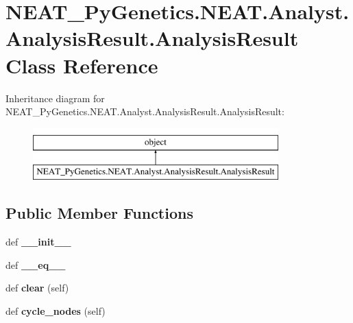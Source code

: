 \hypertarget{class_n_e_a_t___py_genetics_1_1_n_e_a_t_1_1_analyst_1_1_analysis_result_1_1_analysis_result}{}\section{N\+E\+A\+T\+\_\+\+Py\+Genetics.\+N\+E\+A\+T.\+Analyst.\+Analysis\+Result.\+Analysis\+Result Class Reference}
\label{class_n_e_a_t___py_genetics_1_1_n_e_a_t_1_1_analyst_1_1_analysis_result_1_1_analysis_result}
Inheritance diagram for N\+E\+A\+T\+\_\+\+Py\+Genetics.\+N\+E\+A\+T.\+Analyst.\+Analysis\+Result.\+Analysis\+Result\+:\begin{figure}[H]
\begin{center}
\leavevmode
\includegraphics[height=2.000000cm]{class_n_e_a_t___py_genetics_1_1_n_e_a_t_1_1_analyst_1_1_analysis_result_1_1_analysis_result}
\end{center}
\end{figure}
\subsection*{Public Member Functions}
\begin{DoxyCompactItemize}
\item 
def {\bfseries \+\_\+\+\_\+init\+\_\+\+\_\+}\hypertarget{class_n_e_a_t___py_genetics_1_1_n_e_a_t_1_1_analyst_1_1_analysis_result_1_1_analysis_result_a76e2ba4c3bec7e93ab1c78e281a8504d}{}\label{class_n_e_a_t___py_genetics_1_1_n_e_a_t_1_1_analyst_1_1_analysis_result_1_1_analysis_result_a76e2ba4c3bec7e93ab1c78e281a8504d}

\item 
def {\bfseries \+\_\+\+\_\+eq\+\_\+\+\_\+}\hypertarget{class_n_e_a_t___py_genetics_1_1_n_e_a_t_1_1_analyst_1_1_analysis_result_1_1_analysis_result_a6145154aa0f23413e57312a78cc12f91}{}\label{class_n_e_a_t___py_genetics_1_1_n_e_a_t_1_1_analyst_1_1_analysis_result_1_1_analysis_result_a6145154aa0f23413e57312a78cc12f91}

\item 
def {\bfseries clear} (self)\hypertarget{class_n_e_a_t___py_genetics_1_1_n_e_a_t_1_1_analyst_1_1_analysis_result_1_1_analysis_result_abc4627be334a397f27b8173cb4a21796}{}\label{class_n_e_a_t___py_genetics_1_1_n_e_a_t_1_1_analyst_1_1_analysis_result_1_1_analysis_result_abc4627be334a397f27b8173cb4a21796}

\item 
def {\bfseries cycle\+\_\+nodes} (self)\hypertarget{class_n_e_a_t___py_genetics_1_1_n_e_a_t_1_1_analyst_1_1_analysis_result_1_1_analysis_result_ad3a9bbe518536d18882346d8ee9dd28e}{}\label{class_n_e_a_t___py_genetics_1_1_n_e_a_t_1_1_analyst_1_1_analysis_result_1_1_analysis_result_ad3a9bbe518536d18882346d8ee9dd28e}

\end{DoxyCompactItemize}
